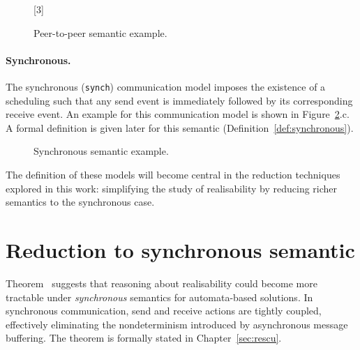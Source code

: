 \begin{figure}[!ht]
    \centering
      \begin{msc}[draw frame=none, draw head=none, msc keyword=, 
                    head height=0px, label distance=0.5ex, 
                    foot height=0px, foot distance=0px]{}

            [3]
            \nextlevel
            \nextlevel
        \end{msc}
  \caption{Peer-to-peer semantic example.}
  \label{fig:p2p}
\end{figure}

\paragraph{Synchronous.}
The synchronous (\verb|synch|) communication model imposes 
the existence of a scheduling such that any send event is 
immediately followed by its corresponding receive event. 
An example for this communication model is shown in 
Figure~\ref{fig:sync}.c. A formal definition is given later 
for this semantic (Definition~\ref{def:synchronous}).

\begin{figure}[!ht]
    \centering
      \begin{msc}[draw frame=none, draw head=none, msc keyword=, 
                  head height=0px, label distance=0.5ex, 
                  foot height=0px, foot distance=0px]{}

          \nextlevel
      \end{msc}
  \caption{Synchronous semantic example.}
  \label{fig:sync}
\end{figure}

The definition of these models will become central in
the reduction techniques explored in this work: 
simplifying the study of realisability
by reducing richer semantics to the synchronous case.

\section{Reduction to synchronous semantic}\label{sec:red}
Theorem~\cite[Theorem 5.3]{di2025realisability} suggests that reasoning
about realisability could become more tractable under \emph{synchronous}
semantics for automata-based solutions. In
synchronous communication, send and receive actions are tightly coupled,
effectively eliminating the nondeterminism introduced by asynchronous
message buffering. The theorem is formally stated in Chapter~\ref{sec:rescu}.

